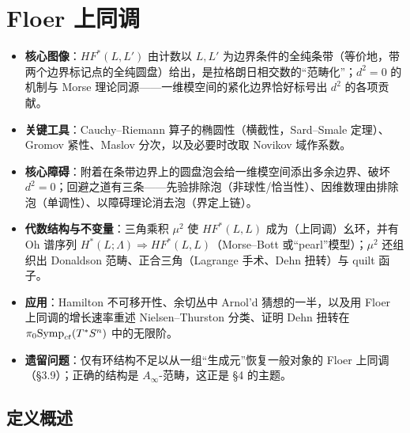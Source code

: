 
\section{Floer 上同调}\label{Sec:Floer}

\begin{keypoints}
\begin{itemize}
  \item \textbf{核心图像}：$HF^*(L,L')$ 由计数以 $L,L'$ 为边界条件的全纯条带（等价地，带两个边界标记点的全纯圆盘）给出，是拉格朗日相交数的“范畴化”；$d^2=0$ 的机制与 Morse 理论同源——一维模空间的紧化边界恰好标号出 $d^2$ 的各项贡献。
  \item \textbf{关键工具}：Cauchy–Riemann 算子的椭圆性（横截性，Sard–Smale 定理）、Gromov 紧性、Maslov 分次，以及必要时改取 Novikov 域作系数。
  \item \textbf{核心障碍}：附着在条带边界上的圆盘泡会给一维模空间添出多余边界、破坏 $d^2=0$；回避之道有三条——先验排除泡（非球性/恰当性）、因维数理由排除泡（单调性）、以障碍理论消去泡（界定上链）。
  \item \textbf{代数结构与不变量}：三角乘积 $\mu^2$ 使 $HF^*(L,L)$ 成为（上同调）幺环，并有 Oh 谱序列 $H^*(L;\Lambda)\Rightarrow HF^*(L,L)$（Morse–Bott 或“pearl”模型）；$\mu^2$ 还组织出 Donaldson 范畴、正合三角（Lagrange 手术、Dehn 扭转）与 quilt 函子。
  \item \textbf{应用}：Hamilton 不可移开性、余切丛中 Arnol'd 猜想的一半，以及用 Floer 上同调的增长速率重述 Nielsen–Thurston 分类、证明 Dehn 扭转在 $\pi_0\mathrm{Symp}_{ct}(T^*S^n)$ 中的无限阶。
  \item \textbf{遗留问题}：仅有环结构不足以从一组“生成元”恢复一般对象的 Floer 上同调（§3.9）；正确的结构是 $A_\infty$-范畴，这正是 §4 的主题。
\end{itemize}
\end{keypoints}

\subsection{定义概述}

